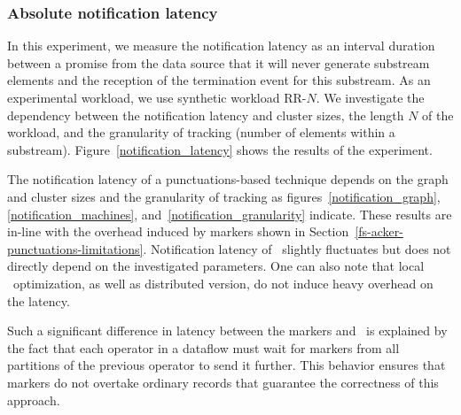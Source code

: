\subsubsection{Absolute notification latency}
\label{absolute-latency}

In this experiment, we measure the notification latency as an interval duration between a promise from the data source that it will never generate substream elements and the reception of the termination event for this substream. As an experimental workload, we use synthetic workload RR-$N$. We investigate the dependency between the notification latency and cluster sizes, the length $N$ of the workload, and the granularity of tracking (number of elements within a substream). Figure~\ref{notification_latency} shows the results of the experiment. 

The notification latency of a punctuations-based technique depends on the graph and cluster sizes and the granularity of tracking as figures~\ref{notification_graph},\ref{notification_machines}, and~\ref{notification_granularity} indicate. These results are in-line with the overhead induced by markers shown in Section~\ref{fs-acker-punctuations-limitations}. Notification latency of \tracker\ slightly fluctuates but does not directly depend on the investigated parameters. One can also note that local \tracker\ optimization, as well as distributed version, do not induce heavy overhead on the latency.

Such a significant difference in latency between the markers and \tracker\ is explained by the fact that each operator in a dataflow must wait for markers from all partitions of the previous operator to send it further. This behavior ensures that markers do not overtake ordinary records that guarantee the correctness of this approach.


